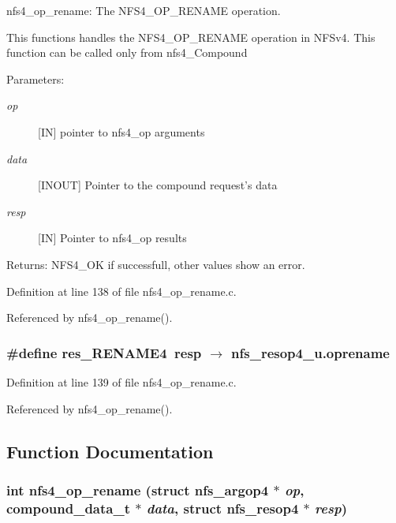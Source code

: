 nfs4\_\-op\_\-rename: The NFS4\_\-OP\_\-RENAME operation.

This functions handles the NFS4\_\-OP\_\-RENAME operation in NFSv4. This function can be called only from nfs4\_\-Compound

\begin{Desc}
\item[Parameters:]
\begin{description}
\item[{\em op}][IN] pointer to nfs4\_\-op arguments \item[{\em data}][INOUT] Pointer to the compound request's data \item[{\em resp}][IN] Pointer to nfs4\_\-op results\end{description}
\end{Desc}
\begin{Desc}
\item[Returns:]NFS4\_\-OK if successfull, other values show an error. \end{Desc}


Definition at line 138 of file nfs4\_\-op\_\-rename.c.

Referenced by nfs4\_\-op\_\-rename().
\subsubsection{\setlength{\rightskip}{0pt plus 5cm}\#define res\_\-RENAME4\ resp $\rightarrow$ nfs\_\-resop4\_\-u.oprename}\label{nfs4__op__rename_8c_a1}




Definition at line 139 of file nfs4\_\-op\_\-rename.c.

Referenced by nfs4\_\-op\_\-rename().

\subsection{Function Documentation}
\subsubsection{\setlength{\rightskip}{0pt plus 5cm}int nfs4\_\-op\_\-rename (struct nfs\_\-argop4 $\ast$ {\em op}, compound\_\-data\_\-t $\ast$ {\em data}, struct nfs\_\-resop4 $\ast$ {\em resp})}\label{nfs4__op__rename_8c_a2}




